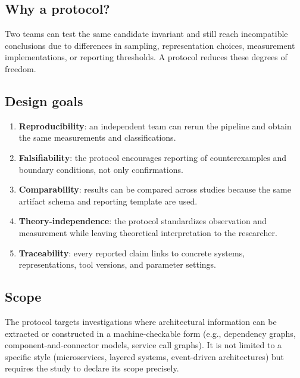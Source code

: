 \subsection*{Why a protocol?}
Two teams can test the same candidate invariant and still reach incompatible conclusions due to differences in sampling, representation choices, measurement implementations, or reporting thresholds. A protocol reduces these degrees of freedom.

\subsection*{Design goals}
\begin{enumerate}[label=G\arabic*., leftmargin=*]
  \item \textbf{Reproducibility}: an independent team can rerun the pipeline and obtain the same measurements and classifications.
  \item \textbf{Falsifiability}: the protocol encourages reporting of counterexamples and boundary conditions, not only confirmations.
  \item \textbf{Comparability}: results can be compared across studies because the same artifact schema and reporting template are used.
  \item \textbf{Theory-independence}: the protocol standardizes observation and measurement while leaving theoretical interpretation to the researcher.
  \item \textbf{Traceability}: every reported claim links to concrete systems, representations, tool versions, and parameter settings.
\end{enumerate}

\subsection*{Scope}
The protocol targets investigations where architectural information can be extracted or constructed in a machine-checkable form (e.g., dependency graphs, component-and-connector models, service call graphs). It is not limited to a specific style (microservices, layered systems, event-driven architectures) but requires the study to declare its scope precisely.